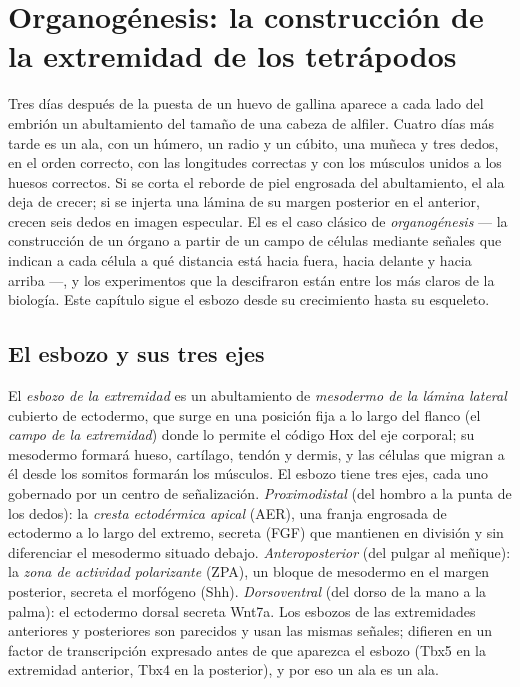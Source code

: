 \chapter{Organogénesis: la construcción de la extremidad de los tetrápodos}\label{ch:b2:limb-organogenesis}

Tres días después de la puesta de un huevo de gallina aparece a cada lado
del embrión un abultamiento del tamaño de una cabeza de alfiler. Cuatro
días más tarde es un ala, con un húmero, un radio y un cúbito, una muñeca y
tres dedos, en el orden correcto, con las longitudes correctas y con los
músculos unidos a los huesos correctos. Si se corta el reborde de piel
engrosada del abultamiento, el ala deja de crecer; si se injerta una
lámina de su margen posterior en el anterior, crecen seis dedos en imagen
especular. El  es el caso clásico de
\emph{organogénesis} --- la construcción de un órgano a partir de un
campo de células mediante señales que indican a cada célula a qué
distancia está hacia fuera, hacia delante y hacia arriba ---, y los
experimentos que la descifraron están entre los más claros de la
biología. Este capítulo sigue el esbozo desde su crecimiento hasta su
esqueleto.

\section{El esbozo y sus tres ejes}

\begin{definition}\label{def:b2:limb-organogenesis:bud}
El \emph{esbozo de la extremidad} es un abultamiento de \emph{mesodermo de
la lámina lateral} cubierto de ectodermo, que surge en una posición fija a
lo largo del flanco (el \emph{campo de la extremidad}) donde lo permite el
código Hox del eje corporal; su mesodermo formará hueso, cartílago,
tendón y dermis, y las células que migran a él desde los somitos formarán
los músculos. El esbozo tiene tres ejes, cada uno gobernado por un centro
de señalización. \emph{Proximodistal} (del hombro a la punta de los
dedos): la \emph{cresta ectodérmica apical} (AER), una franja engrosada de
ectodermo a lo largo del extremo, secreta  (FGF) que mantienen en división y sin diferenciar el
mesodermo situado debajo. \emph{Anteroposterior} (del pulgar al meñique):
la \emph{zona de actividad polarizante} (ZPA), un bloque de mesodermo en
el margen posterior, secreta el morfógeno \emph{} (Shh).
\emph{Dorsoventral} (del dorso de la mano a la palma): el ectodermo dorsal
secreta Wnt7a. Los esbozos de las extremidades anteriores y posteriores
son parecidos y usan las mismas señales; difieren en un factor de
transcripción expresado antes de que aparezca el esbozo (Tbx5 en la
extremidad anterior, Tbx4 en la posterior), y por eso un ala es un ala.
\end{definition}

